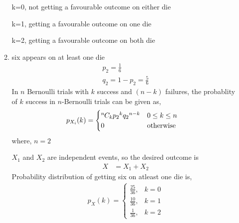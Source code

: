 \documentclass{article}
\newcommand*{\permcomb}[4][0mu]{{{}^{#3}\mkern#1#2_{#4}}}
\newcommand*{\comb}[1][-1mu]{\permcomb[#1]{C}}
\begin{document}
\begin{enumerate}[label=13.\arabic{enumi}.\arabic{enumii}]
\begin{enumerate}
k=0, not getting a favourable outcome on either die

k=1, getting a favourable outcome on one die

k=2, getting a favourable outcome on both die
\item six appears on at least one die
\begin{align}
p_2 = \frac{1}{6}\\            
q_2 = 1 - p_2 = \frac{5}{6}      
\end{align}
In $n$ Bernoulli trials with $k$ success and $(n - k)$ failures, the probablity of $k$ success in $n$-Bernoulli trials can be given as,
\begin{align}
p_{X_i}(k)   &= 
\begin{cases}
\comb{n}{k}{p_2}^{k}{q_2}^{n-k} & 0 \le k \le n\\
0 & \text{otherwise}                
\end{cases}
\end{align}
where, $n = 2$

$X_1$ and $X_2$ are independent events, so the desired outcome is
\begin{align}
X&=X_1+X_2
\end{align}
Probability distribution of getting six on atleast one die is,
\begin{align}
  p_{X}(k) =
    \begin{cases}
      \frac{25}{36}, &  k = 0\\
      \frac{10}{36}, & k = 1\\
      \frac{1}{36}, & k = 2
    \end{cases}       
\end{align}
\end{enumerate}
\end{enumerate}
\end{document}
